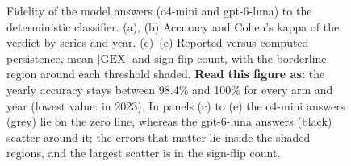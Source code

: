 \begin{figure}[H]
\centering
\resultfigure{\figFidelity}
\caption{Fidelity of the model answers (o4-mini and gpt-6-luna) to the deterministic classifier. (a), (b) Accuracy and Cohen's kappa of the verdict by series and year. (c)--(e) Reported versus computed persistence, mean $|\mathrm{GEX}|$ and sign-flip count, with the borderline region around each threshold shaded. \textbf{Read this figure as:} the yearly accuracy stays between 98.4\% and 100\% for every arm and year (lowest value:  in 2023). In panels (c) to (e) the o4-mini answers (grey) lie on the zero line, whereas the gpt-6-luna answers (black) scatter around it; the errors that matter lie inside the shaded regions, and the largest scatter is in the sign-flip count.}
\label{fig:fidelity}
\end{figure}
